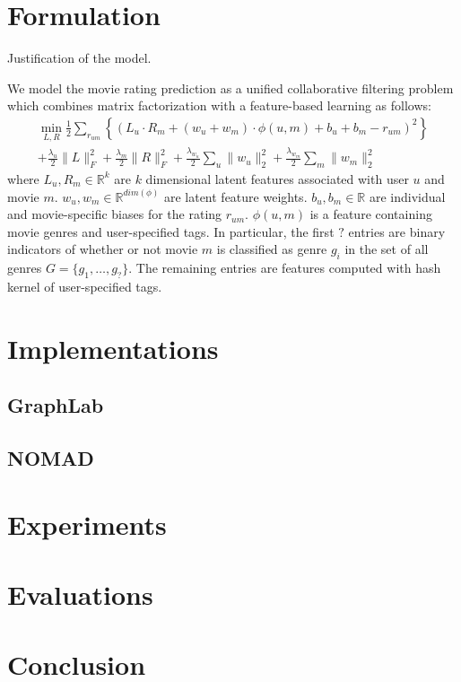 \documentclass{article} %
\begin{document}
\section{Formulation}
Justification of the model.

We model the movie rating prediction as a unified collaborative filtering problem which combines matrix factorization with a feature-based learning as follows:
\begin{multline}
\min_{L, R} \frac{1}{2}\sum_{r_{um}} \left\{(L_u \cdot R_m + (w_u + w_m) \cdot \phi(u, m) + b_u + b_m - r_{um})^2\right\}\\ + \frac{\lambda_u}{2}\|L\|^2_F + \frac{\lambda_m}{2}\|R\|^2_F + \frac{\lambda_{w_u}}{2}\sum_u\|w_u\|^2_2 + \frac{\lambda_{w_m}}{2}\sum_m\|w_m\|^2_2
\end{multline}
where $L_u, R_m \in \mathbb{R}^k$ are $k$ dimensional latent features associated with user $u$ and movie $m$. $w_u,w_m \in \mathbb{R}^{dim(\phi)}$ are latent feature weights. $b_u, b_m \in \mathbb{R}$ are individual and movie-specific biases for the rating $r_{um}$. $\phi(u, m)$ is a feature containing movie genres and user-specified tags. In particular, the first $?$ entries are binary indicators of whether or not movie $m$ is classified as genre $g_i$ in the set of all genres $G = \{g_1,\ldots, g_?\}$. The remaining entries are features computed with hash kernel of user-specified tags.
\section{Implementations}
\subsection{GraphLab}
\subsection{NOMAD}
\section{Experiments}
\section{Evaluations}
\section{Conclusion}



{}
\end{document}
